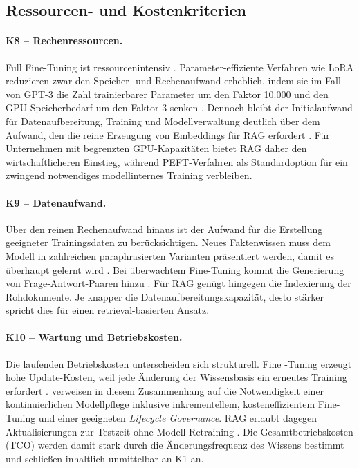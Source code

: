 \subsection{Ressourcen- und Kostenkriterien}
\label{sec:krit-ressourcen}

\paragraph{K8 -- Rechenressourcen.}\label{krit:k8}
Full Fine-Tuning ist ressourcenintensiv \autocite[1f.]{Soudani.2024}. Parameter-effiziente Verfahren wie LoRA reduzieren zwar den Speicher- und Rechenaufwand erheblich, indem sie im Fall von GPT-3 die Zahl trainierbarer Parameter um den Faktor 10.000 und den GPU-Speicherbedarf um den Faktor 3 senken \autocite[1]{Hu.2022}.
Dennoch bleibt der Initialaufwand für Datenaufbereitung, Training und Modellverwaltung deutlich über dem Aufwand, den die reine Erzeugung von Embeddings für RAG erfordert \autocite[29]{Balaguer.2024}.
Für Unternehmen mit begrenzten GPU-Kapazitäten bietet RAG daher den wirtschaftlicheren Einstieg, während PEFT-Verfahren als Standardoption für ein zwingend notwendiges modellinternes Training verbleiben.

\paragraph{K9 -- Datenaufwand.}\label{krit:k9}
Über den reinen Rechenaufwand hinaus ist der Aufwand für die Erstellung geeigneter Trainingsdaten zu berücksichtigen. Neues Faktenwissen muss dem Modell in zahlreichen paraphrasierten Varianten präsentiert werden, damit es überhaupt gelernt wird \autocite[1]{Ovadia.2024}.
Bei überwachtem Fine-Tuning kommt die Generierung von Frage-Antwort-Paaren hinzu \autocite[10]{Balaguer.2024}.
Für RAG genügt hingegen die Indexierung der Rohdokumente. Je knapper die Datenaufbereitungskapazität, desto stärker spricht dies für einen retrieval-basierten Ansatz.

\paragraph{K10 -- Wartung und Betriebskosten.}\label{krit:k10}
Die laufenden Betriebskosten unterscheiden sich strukturell. Fine -Tuning erzeugt hohe Update-Kosten, weil jede Änderung der Wissensbasis ein erneutes Training erfordert \autocite[3f.]{Song.2025}.
\textcite[17f., 23]{Karakurt.2026} verweisen in diesem Zusammenhang auf die Notwendigkeit einer kontinuierlichen Modellpflege inklusive inkrementellem, kosteneffizientem Fine\--Tuning und einer geeigneten \textit{Lifecycle Governance}.
RAG erlaubt dagegen Aktualisierungen zur Testzeit ohne Modell-Retraining \autocite[5]{Gao.2024}.
Die Gesamtbetriebskosten (TCO) werden damit stark durch die Änderungsfrequenz des Wissens bestimmt und schließen inhaltlich unmittelbar an K1 an.

